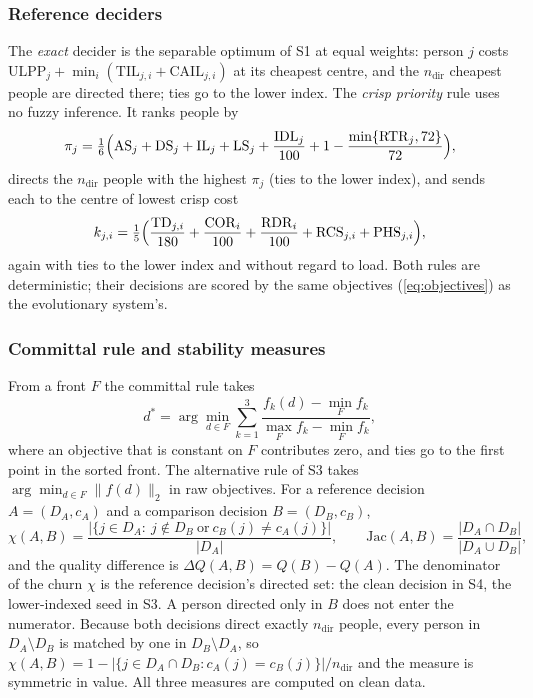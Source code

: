 \documentclass[systems,article,submit,moreauthors,pdftex]{Definitions/mdpi}
\begin{document}
\subsubsection{Reference deciders}
The \emph{exact} decider is the separable optimum of S1 at equal weights: person $j$ costs
$\mathrm{ULPP}_j+\min_i(\mathrm{TIL}_{j,i}+\mathrm{CAIL}_{j,i})$ at its cheapest centre, and the
$n_{\mathrm{dir}}$ cheapest people are directed there; ties go to the lower index. The
\emph{crisp priority} rule uses no fuzzy inference. It ranks people by
\begin{equation}\label{eq:crisp-priority}
\pi_j=\tfrac16\Bigl(\mathrm{AS}_j+\mathrm{DS}_j+\mathrm{IL}_j+\mathrm{LS}_j+\frac{\mathrm{IDL}_j}{100}
+1-\frac{\min\{\mathrm{RTR}_j,72\}}{72}\Bigr),
\end{equation}
directs the $n_{\mathrm{dir}}$ people with the highest $\pi_j$ (ties to the lower index), and
sends each to the centre of lowest crisp cost
\begin{equation}\label{eq:crisp-cost}
k_{j,i}=\tfrac15\Bigl(\frac{\mathrm{TD}_{j,i}}{180}+\frac{\mathrm{COR}_i}{100}+\frac{\mathrm{RDR}_i}{100}
+\mathrm{RCS}_{j,i}+\mathrm{PHS}_{j,i}\Bigr),
\end{equation}
again with ties to the lower index and without regard to load. Both rules are deterministic;
their decisions are scored by the same objectives (\ref{eq:objectives}) as the evolutionary
system's.

\subsubsection{Committal rule and stability measures}
From a front $F$ the committal rule takes
\begin{equation}\label{eq:committal}
d^\ast=\arg\min_{d\in F}\sum_{k=1}^{3}\frac{f_k(d)-\min_{F}f_k}{\max_{F}f_k-\min_{F}f_k},
\end{equation}
where an objective that is constant on $F$ contributes zero, and ties go to the first point
in the sorted front. The alternative rule of S3 takes $\arg\min_{d\in F}\lVert f(d)\rVert_2$
in raw objectives. For a reference decision $A=(D_A,c_A)$ and a comparison decision
$B=(D_B,c_B)$,
\begin{equation}\label{eq:churn}
\chi(A,B)=\frac{\bigl|\{j\in D_A:\ j\notin D_B\ \text{or}\ c_B(j)\neq c_A(j)\}\bigr|}{|D_A|},
\qquad
\mathrm{Jac}(A,B)=\frac{|D_A\cap D_B|}{|D_A\cup D_B|},
\end{equation}
and the quality difference is $\Delta Q(A,B)=Q(B)-Q(A)$.
The denominator of the churn $\chi$ is the reference decision's directed set: the clean
decision in S4, the lower-indexed seed in S3. A person directed only in $B$ does not enter the
numerator. Because both decisions direct exactly $n_{\mathrm{dir}}$ people, every person in
$D_A\setminus D_B$ is matched by one in $D_B\setminus D_A$, so
$\chi(A,B)=1-|\{j\in D_A\cap D_B: c_A(j)=c_B(j)\}|/n_{\mathrm{dir}}$ and the measure is
symmetric in value. All three measures are computed on clean data.
\end{document}
